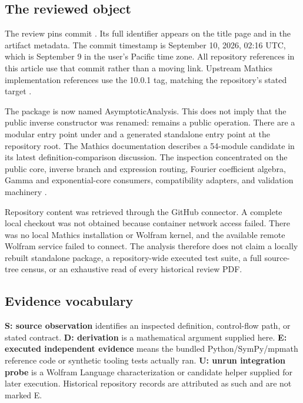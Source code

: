 \documentclass[11pt,a4paper]{article}
\newcommand{\code}[1]{\texttt{\detokenize{#1}}}
\theoremstyle{remark}
\begin{document}
\subsection{The reviewed object}

The review pins commit \code{513917b}. Its full identifier appears on the title page and in the artifact metadata. The commit timestamp is September 10, 2026, 02:16 UTC, which is September 9 in the user's Pacific time zone. All repository references in this article use that commit rather than a moving \code{main} link. Upstream Mathics implementation references use the 10.0.1 tag, matching the repository's stated target \cite{commit,compatibility}.

The package is now named AsymptoticAnalysis. This does not imply that the public inverse constructor was renamed: \code{AsymptoticInverse} remains a public operation. There are a modular entry point under  and a generated standalone entry point at the repository root. The Mathics documentation describes a 54-module candidate in its latest definition-comparison discussion. The inspection concentrated on the public core, inverse branch and expression routing, Fourier coefficient algebra, Gamma and exponential-core consumers, compatibility adapters, and validation machinery \cite{core,compatibility}.

Repository content was retrieved through the GitHub connector. A complete local checkout was not obtained because container network access failed. There was no local Mathics installation or Wolfram kernel, and the available remote Wolfram service failed to connect. The analysis therefore does not claim a locally rebuilt standalone package, a repository-wide executed test suite, a full source-tree census, or an exhaustive read of every historical review PDF.

\subsection{Evidence vocabulary}

\textbf{S: source observation} identifies an inspected definition, control-flow path, or stated contract. \textbf{D: derivation} is a mathematical argument supplied here. \textbf{E: executed independent evidence} means the bundled Python/SymPy/mpmath reference code or synthetic tooling tests actually ran. \textbf{U: unrun integration probe} is a Wolfram Language characterization or candidate helper supplied for later execution. Historical repository records are attributed as such and are not marked E.
\end{document}
